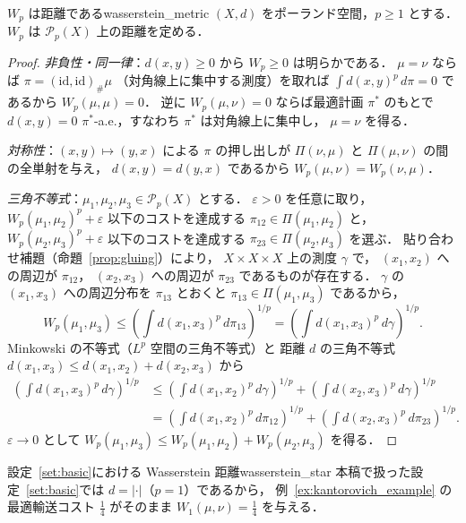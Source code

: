 \documentclass[uplatex, dvipdfmx]{jsarticle}
\begin{document}
\begin{theorem}{$W_p$ は距離である}{wasserstein_metric}
$(X,d)$ をポーランド空間，$p\ge 1$ とする．
$W_p$ は $\mathcal{P}_p(X)$ 上の距離を定める．
\end{theorem}

\begin{proof}
\textit{非負性・同一律}：$d(x,y)\ge 0$ から $W_p\ge 0$ は明らかである．
$\mu=\nu$ ならば $\pi=(\mathrm{id},\mathrm{id})_\#\mu$
（対角線上に集中する測度）を取れば
$\int d(x,y)^p\,d\pi=0$ であるから $W_p(\mu,\mu)=0$．
逆に $W_p(\mu,\nu)=0$ ならば最適計画 $\pi^*$ のもとで
$d(x,y)=0$ $\pi^*$-a.e.，すなわち $\pi^*$ は対角線上に集中し，
$\mu=\nu$ を得る．

\textit{対称性}：$(x,y)\mapsto(y,x)$ による $\pi$ の押し出しが
$\Pi(\nu,\mu)$ と $\Pi(\mu,\nu)$ の間の全単射を与え，
$d(x,y)=d(y,x)$ であるから $W_p(\mu,\nu)=W_p(\nu,\mu)$．

\textit{三角不等式}：$\mu_1,\mu_2,\mu_3\in\mathcal{P}_p(X)$ とする．
$\varepsilon>0$ を任意に取り，
$W_p(\mu_1,\mu_2)^p+\varepsilon$ 以下のコストを達成する
$\pi_{12}\in\Pi(\mu_1,\mu_2)$ と，
$W_p(\mu_2,\mu_3)^p+\varepsilon$ 以下のコストを達成する
$\pi_{23}\in\Pi(\mu_2,\mu_3)$ を選ぶ．
貼り合わせ補題（命題~\ref{prop:gluing}）により，
$X\times X\times X$ 上の測度 $\gamma$ で，
$(x_1,x_2)$ への周辺が $\pi_{12}$，
$(x_2,x_3)$ への周辺が $\pi_{23}$ であるものが存在する．
$\gamma$ の $(x_1,x_3)$ への周辺分布を $\pi_{13}$ とおくと
$\pi_{13}\in\Pi(\mu_1,\mu_3)$ であるから，
\[
  W_p(\mu_1,\mu_3)
  \le \left(\int d(x_1,x_3)^p\,d\pi_{13}\right)^{1/p}
  = \left(\int d(x_1,x_3)^p\,d\gamma\right)^{1/p}.
\]
Minkowski の不等式（$L^p$ 空間の三角不等式）と
距離 $d$ の三角不等式 $d(x_1,x_3)\le d(x_1,x_2)+d(x_2,x_3)$ から
\begin{align*}
  \left(\int d(x_1,x_3)^p\,d\gamma\right)^{1/p}
  &\le \left(\int d(x_1,x_2)^p\,d\gamma\right)^{1/p}
     + \left(\int d(x_2,x_3)^p\,d\gamma\right)^{1/p} \\
  &= \left(\int d(x_1,x_2)^p\,d\pi_{12}\right)^{1/p}
     + \left(\int d(x_2,x_3)^p\,d\pi_{23}\right)^{1/p}.
\end{align*}
$\varepsilon\to 0$ として
$W_p(\mu_1,\mu_3)\le W_p(\mu_1,\mu_2)+W_p(\mu_2,\mu_3)$ を得る．
\end{proof}

\begin{example}{設定~\ref{set:basic}における Wasserstein 距離}{wasserstein_star}
本稿で扱った設定~\ref{set:basic}では $d=|\cdot|$（$p=1$）であるから，
例~\ref{ex:kantorovich_example} の最適輸送コスト $\tfrac{1}{4}$ がそのまま
$W_1(\mu,\nu) = \tfrac{1}{4}$ を与える．
\end{example}
\end{document}
